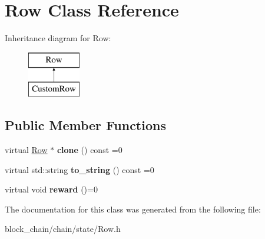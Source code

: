 \hypertarget{classRow}{}\section{Row Class Reference}
\label{classRow}
Inheritance diagram for Row\+:\begin{figure}[H]
\begin{center}
\leavevmode
\includegraphics[height=2.000000cm]{classRow}
\end{center}
\end{figure}
\subsection*{Public Member Functions}
\begin{DoxyCompactItemize}
\item 
\mbox{\label{classRow_ae3e9c3aaa17ebc4f0e280cdec722440a}} 
virtual \mbox{\hyperlink{classRow}{Row}} $\ast$ {\bfseries clone} () const =0
\item 
\mbox{\label{classRow_ae7b1aba7a4c868914700432850c2848d}} 
virtual std\+::string {\bfseries to\+\_\+string} () const =0
\item 
\mbox{\label{classRow_a851b728fa55ecb26f8ebbc87e614581b}} 
virtual void {\bfseries reward} ()=0
\end{DoxyCompactItemize}


The documentation for this class was generated from the following file\+:\begin{DoxyCompactItemize}
\item 
block\+\_\+chain/chain/state/Row.\+h\end{DoxyCompactItemize}
